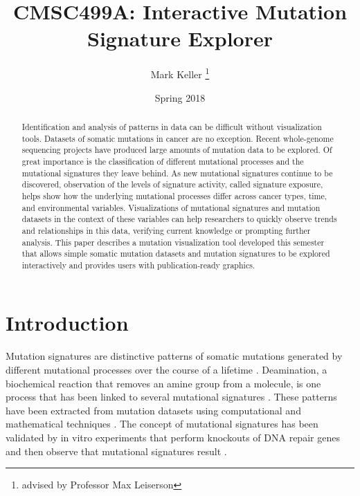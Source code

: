 \documentclass[12pt, letterpaper]{article}
\title{CMSC499A: Interactive Mutation Signature Explorer}
\author{Mark Keller \thanks{advised by Professor Max Leiserson}}
\date{Spring 2018}
\begin{document}
\maketitle

\begin{abstract}
Identification and analysis of patterns in data can be difficult without visualization tools. 
Datasets of somatic mutations in cancer are no exception.
Recent whole-genome sequencing projects have produced large amounts of mutation data to be explored.
Of great importance is the classification of different mutational processes and the mutational signatures \citep{alexandrov2013signatures} they leave behind.
As new mutational signatures continue to be discovered, observation of the levels of signature activity, called signature exposure, helps show how the underlying mutational processes differ across cancer types, time, and environmental variables.
Visualizations of mutational signatures and mutation datasets in the context of these variables can help researchers to quickly observe trends and relationships in this data, verifying current knowledge or prompting further analysis.
This paper describes a mutation visualization tool developed this semester that allows simple somatic mutation datasets and mutation signatures to be explored interactively and provides users with publication-ready graphics.
\end{abstract}

\section{Introduction}
Mutation signatures are distinctive patterns of somatic mutations generated by different mutational processes over the course of a lifetime \citep{alexandrov2013signatures}.
Deamination, a biochemical reaction that removes an amine group from a molecule, is one process that has been linked to several mutational signatures \citep{helleday2014mechanisms}.
These patterns have been extracted from mutation datasets using computational and mathematical techniques \citep{alexandrov2013deciphering}.
The concept of mutational signatures has been validated by in vitro experiments that perform knockouts of DNA repair genes and then observe that mutational signatures result \citep{zou2018validating,nik2015genome}.
\end{document}

